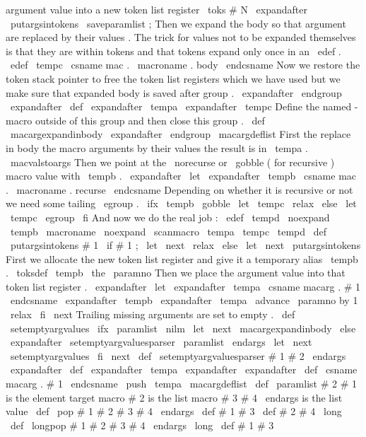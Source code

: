 {{{{argument
%
value
into
a
new
token
list
register
\
toks
#
N
\
expandafter
\
putargsintokens
\
saveparamlist
;
%
%
Then
we
expand
the
body
so
that
argument
are
replaced
by
their
%
values
.
The
trick
for
values
not
to
be
expanded
themselves
is
that
they
%
are
within
tokens
and
that
tokens
expand
only
once
in
an
\
edef
.
\
edef
\
tempc
{
\
csname
mac
.
\
macroname
.
body
\
endcsname
}
%
%
Now
we
restore
the
token
stack
pointer
to
free
the
token
list
registers
%
which
we
have
used
but
we
make
sure
that
expanded
body
is
saved
after
%
group
.
\
expandafter
\
endgroup
\
expandafter
\
def
\
expandafter
\
tempa
\
expandafter
{
\
tempc
}
%
}
%
Define
the
named
-
macro
outside
of
this
group
and
then
close
this
group
.
%
\
def
\
macargexpandinbody
{
%
\
expandafter
\
endgroup
\
macargdeflist
%
First
the
replace
in
body
the
macro
arguments
by
their
values
the
result
%
is
in
\
tempa
.
\
macvalstoargs
%
Then
we
point
at
the
\
norecurse
or
\
gobble
(
for
recursive
)
macro
value
%
with
\
tempb
.
\
expandafter
\
let
\
expandafter
\
tempb
\
csname
mac
.
\
macroname
.
recurse
\
endcsname
%
Depending
on
whether
it
is
recursive
or
not
we
need
some
tailing
%
\
egroup
.
\
ifx
\
tempb
\
gobble
\
let
\
tempc
\
relax
\
else
\
let
\
tempc
\
egroup
\
fi
%
And
now
we
do
the
real
job
:
\
edef
\
tempd
{
\
noexpand
\
tempb
{
\
macroname
}
\
noexpand
\
scanmacro
{
\
tempa
}
\
tempc
}
%
\
tempd
}
\
def
\
putargsintokens
#
1
{
%
\
if
#
1
;
\
let
\
next
\
relax
\
else
\
let
\
next
\
putargsintokens
%
First
we
allocate
the
new
token
list
register
and
give
it
a
temporary
%
alias
\
tempb
.
\
toksdef
\
tempb
\
the
\
paramno
%
Then
we
place
the
argument
value
into
that
token
list
register
.
\
expandafter
\
let
\
expandafter
\
tempa
\
csname
macarg
.
#
1
\
endcsname
\
expandafter
\
tempb
\
expandafter
{
\
tempa
}
%
\
advance
\
paramno
by
1
\
relax
\
fi
\
next
}
%
Trailing
missing
arguments
are
set
to
empty
.
%
\
def
\
setemptyargvalues
{
%
\
ifx
\
paramlist
\
nilm
\
let
\
next
\
macargexpandinbody
\
else
\
expandafter
\
setemptyargvaluesparser
\
paramlist
\
endargs
\
let
\
next
\
setemptyargvalues
\
fi
\
next
}
\
def
\
setemptyargvaluesparser
#
1
#
2
\
endargs
{
%
\
expandafter
\
def
\
expandafter
\
tempa
\
expandafter
{
%
\
expandafter
\
def
\
csname
macarg
.
#
1
\
endcsname
{
}
}
%
\
push
\
tempa
\
macargdeflist
\
def
\
paramlist
{
#
2
}
%
}
%
#
1
is
the
element
target
macro
%
#
2
is
the
list
macro
%
#
3
#
4
\
endargs
is
the
list
value
\
def
\
pop
#
1
#
2
#
3
#
4
\
endargs
{
%
\
def
#
1
{
#
3
}
%
\
def
#
2
{
#
4
}
%
}
\
long
\
def
\
longpop
#
1
#
2
#
3
#
4
\
endargs
{
%
\
long
\
def
#
1
{
#
3
}
}}}}
